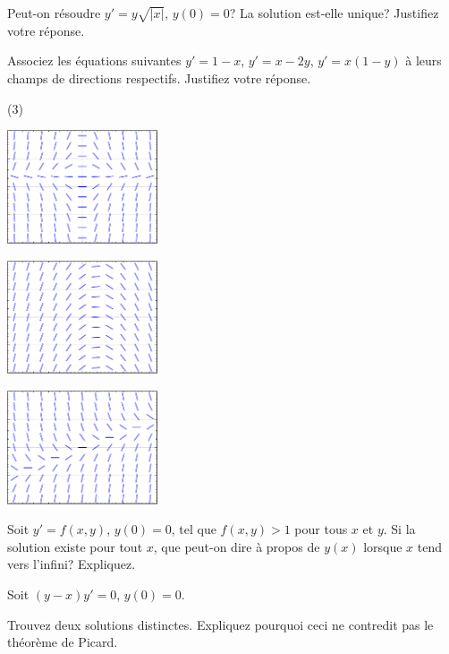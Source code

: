 \begin{exercise}
	Peut-on résoudre  $y' = y\sqrt{\lvert x\rvert}$, $y(0) = 0$?
	La solution est-elle unique?	Justifiez votre réponse.
\end{exercise}

\begin{samepage}
\begin{exercise}
	Associez les équations suivantes $y'=1-x$, $y'=x-2y$, $y' = x(1-y)$ à leurs champs de directions respectifs.
	Justifiez votre réponse.
	\begin{tasks}(3)
		\task \parbox[c]{1.75in}{\includegraphics[width=1.75in]{figures/yprimex1minusyslope}}
		\task \parbox[c]{1.75in}{\includegraphics[width=1.75in]{figures/yprime1minusxslope}}
		\task \parbox[c]{1.75in}{\includegraphics[width=1.75in]{figures/yprimexminus2yslope}}
	\end{tasks}
\end{exercise}
\end{samepage}

\begin{exercise}[défi]
	Soit $y' = f(x,y)$, $y(0) = 0$, tel que $f(x,y) > 1$ pour tous $x$ et $y$.
	Si la solution existe  pour tout $x$,  que peut-on dire à propos de $y(x)$ lorsque $x$ tend vers l'infini?  Expliquez.
\end{exercise}

\begin{exercise}[défi]
	Soit $(y-x)y' = 0$, $y(0) = 0$.
	\begin{tasks}
		\task Trouvez deux solutions distinctes.
		\task Expliquez pourquoi ceci ne contredit pas le théorème de Picard.
	\end{tasks}
\end{exercise}

